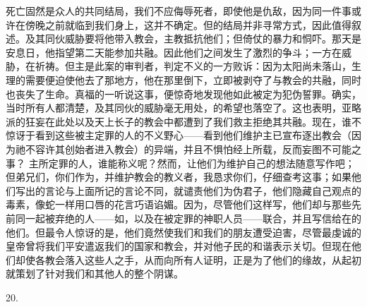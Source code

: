 死亡固然是众人的共同结局，我们不应侮辱死者，即使他是仇敌，因为同一件事或许在傍晚之前就临到我们身上，这并不确定。但的结局并非寻常方式，因此值得叙述。及其同伙威胁要将他带入教会，主教抵抗他们；但倚仗的暴力和恫吓。那天是安息日，他指望第二天能参加共融。因此他们之间发生了激烈的争斗；一方在威胁，在祈祷。但主是此案的审判者，判定不义的一方败诉：因为太阳尚未落山，生理的需要便迫使他去了那地方，他在那里倒下，立即被剥夺了与教会的共融，同时也丧失了生命。真福的一听说这事，便惊奇地发现他如此被定为犯伪誓罪。确实，当时所有人都清楚，及其同伙的威胁毫无用处，的希望也落空了。这也表明，亚略派的狂妄在此处以及天上长子的教会中都遭到了我们救主拒绝其共融。现在，谁不惊讶于看到这些被主定罪的人的不义野心——看到他们维护主已宣布逐出教会（因为祂不容许其创始者进入教会）的异端，并且不惧怕经上所载，反而妄图不可能之事？ 主所定罪的人，谁能称义呢？然而，让他们为维护自己的想法随意写作吧；但弟兄们，你们作为，并维护教会的教义者，我恳求你们，仔细查考这事；如果他们写出的言论与上面所记的言论不同，就谴责他们为伪君子，他们隐藏自己观点的毒素，像蛇一样用口唇的花言巧语谄媚。因为，尽管他们这样写，他们却与那些先前同一起被弃绝的人——如，以及在被定罪的神职人员——联合，并且写信给在的他们。但最令人惊讶的是，他们竟然使我们和我们的朋友遭受迫害，尽管最虔诚的皇帝曾将我们平安遣返我们的国家和教会，并对他子民的和谐表示关切。但现在他们却使各教会落入这些人之手，从而向所有人证明，正是为了他们的缘故，从起初就策划了针对我们和其他人的整个阴谋。\par

20. \par

